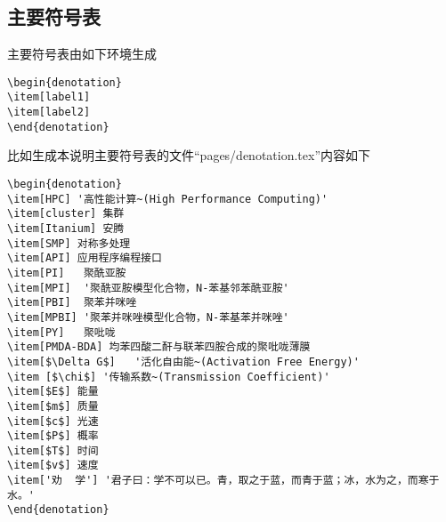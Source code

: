 \subsection{主要符号表}
\label{ch3_3}
主要符号表由如下环境生成
\begin{lstlisting}[frame=single,escapeinside='']
\begin{denotation}
\item[label1]
\item[label2]
\end{denotation}
\end{lstlisting}
比如生成本说明主要符号表的文件``pages/denotation.tex''内容如下
\begin{lstlisting}[frame=single,escapeinside='']
\begin{denotation}
\item[HPC] '高性能计算~(High Performance Computing)'
\item[cluster] 集群
\item[Itanium] 安腾
\item[SMP] 对称多处理
\item[API] 应用程序编程接口
\item[PI]	聚酰亚胺
\item[MPI]	'聚酰亚胺模型化合物，N-苯基邻苯酰亚胺'
\item[PBI]	聚苯并咪唑
\item[MPBI]	'聚苯并咪唑模型化合物，N-苯基苯并咪唑'
\item[PY]	聚吡咙
\item[PMDA-BDA]	均苯四酸二酐与联苯四胺合成的聚吡咙薄膜
\item[$\Delta G$]  	'活化自由能~(Activation Free Energy)'
\item [$\chi$] '传输系数~(Transmission Coefficient)'
\item[$E$] 能量
\item[$m$] 质量
\item[$c$] 光速
\item[$P$] 概率
\item[$T$] 时间
\item[$v$] 速度
\item['劝  学'] '君子曰：学不可以已。青，取之于蓝，而青于蓝；冰，水为之，而寒于水。'
\end{denotation}
\end{lstlisting}

